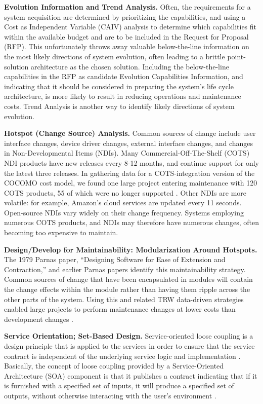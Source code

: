 \textbf{Evolution Information and Trend Analysis.}
Often, the requirements for a system acquisition are determined by prioritizing the capabilities, and using a Cost as Independent Variable (CAIV) analysis to determine which capabilities fit within the available budget and are to be included in the Request for Proposal (RFP).   This unfortunately throws away valuable below-the-line information on the most likely directions of system evolution, often leading to a brittle point-solution architecture as the chosen solution.
Including the below-the-line capabilities in the RFP as candidate Evolution Capabilities Information, and indicating that it should be considered in preparing the system's life cycle architecture, is more likely to result in reducing operations and maintenance costs.
Trend Analysis is another way to identify likely directions of system evolution.

\textbf{Hotspot (Change Source) Analysis.} Common sources of change include user interface changes, device driver changes, external interface changes, and changes in Non-Developmental Items (NDIs).
Many Commercial-Off-The-Shelf (COTS) NDI products have new releases every 8-12 months, and continue support for only the latest three releases.  In gathering data for a COTS-integration version of the COCOMO cost model, we found one large project entering maintenance with 120 COTS products, 55 of which were no longer supported \cite{Abts00cocots:a}.  Other NDIs are more volatile: for example, Amazon's cloud services are updated every 11 seconds.  Open-source NDIs vary widely on their change frequency.  Systems employing numerous COTS products, and NDIs may therefore have numerous changes, often becoming too expensive to maintain.

\textbf{Design/Develop for Maintainability: Modularization Around Hotspots.} The 1979 Parnas paper, ``Designing Software for Ease of Extension and Contraction,'' \cite{parnas1979designing} and earlier Parnas papers identify this maintainability strategy.   Common sources of change that have been encapsulated in modules will contain the change effects within the module rather than having them ripple across the other parts of the system.    Using this and related TRW data-driven strategies enabled large projects to perform maintenance changes at lower costs than development changes \cite{royce1998software}.   

\textbf{Service Orientation; Set-Based Design.} Service-oriented loose coupling is a design principle that is applied to the services in order to ensure that the service contract is independent of the underlying service logic and implementation \cite{sundbo2000innovation}. Basically, the concept of loose coupling provided by a Service-Oriented Architecture (SOA) component is that it publishes a contract indicating that if it is furnished with a specified set of inputs, it will produce a specified set of outputs, without otherwise interacting with the user's environment \cite{boehm2008balancing,borges2004delving}.

